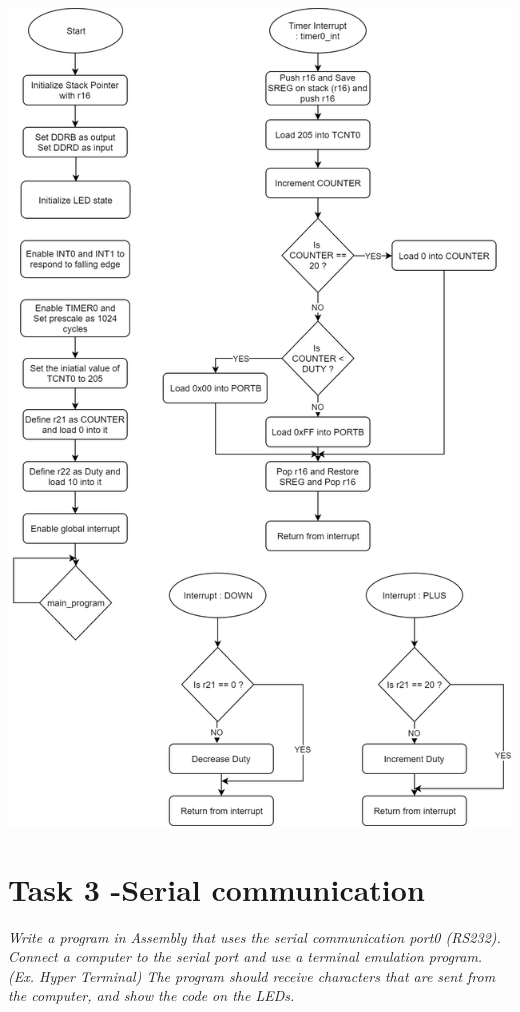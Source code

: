 \documentclass[a4paper,12pt]{article}
\begin{document}
\begin{center}
\includegraphics[scale=0.8]{img/Task2.png}
\end{center}

\newpage
\section{Task 3 -Serial communication}
\textit{Write a program in Assembly that uses the serial communication port0 (RS232). Connect a
computer to the serial port and use a terminal emulation program. (Ex. Hyper Terminal)
The program should receive characters that are sent from the computer, and show the code on
the LEDs.}
\end{document}
